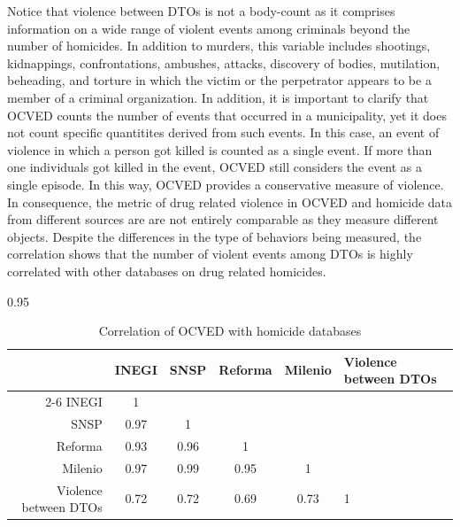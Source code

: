 \documentclass[12pt,letterpaper]{article}
\begin{document}
Notice that violence between DTOs is not a body-count as it comprises information on a wide range of violent events among criminals beyond the number of homicides. In addition to murders, this variable includes shootings, kidnappings, confrontations, ambushes, attacks, discovery of bodies, mutilation, beheading, and torture in which the victim or the perpetrator appears to be a member of a criminal organization. In addition, it is important to clarify that OCVED counts the number of events that occurred in a municipality, yet it does not count specific quantitites derived from such events. In this case, an event of violence in which a person got killed is counted as a single event. If more than one individuals got killed in the event, OCVED still considers the event as a single episode. In this way, OCVED provides a conservative measure of violence. In consequence, the metric of drug related violence in OCVED and homicide data from different sources are are not entirely comparable as they measure different objects.  Despite the differences in the type of behaviors being measured, the correlation shows that the number of violent events among DTOs is highly correlated with other databases on drug related homicides. 

 
 
 

\begin{table}[h!]
\small
    \caption{Correlation of OCVED with homicide databases}
    \label{tab:corr_ocved_others_homicide}
\begin{spacing}{0.95}
    \centering
    \begin{tabular}{rccccp{2cm}}
    \hline
	&	INEGI	&	SNSP	&	Reforma	&	Milenio	&	Violence between DTOs		\\	\cline{2-6}
INEGI	&	1	&		&		&		&			\\	
SNSP	&	0.97	&	1	&		&		&			\\	
Reforma	&	0.93	&	0.96	&	1	&		&			\\	
Milenio	&	0.97	&	0.99	&	0.95	&	1	&			\\	
Violence between DTOs	&	0.72	&	0.72	&	0.69	&	0.73	&	1		\\	\hline
\end{tabular}
\end{spacing}
\end{table}
\end{document}
